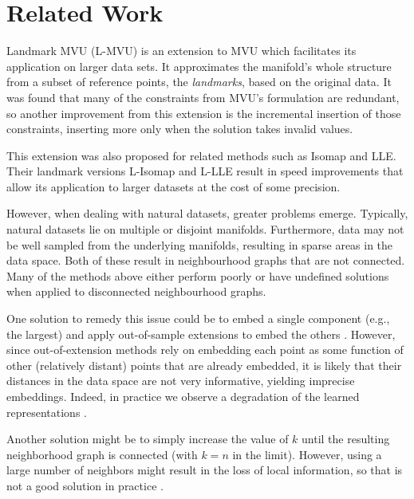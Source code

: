 \section{Related Work}

    Landmark MVU (L-MVU) \cite{l-mvu} is an extension to MVU which facilitates its application on larger data sets. It approximates the manifold's whole structure from a subset of reference points, the \textit{landmarks}, based on the original data. It was found that many of the constraints from MVU's formulation are redundant, so another improvement from this extension is the incremental insertion of those constraints, inserting more only when the solution takes invalid values.

    This extension was also proposed for related methods such as Isomap and LLE. Their landmark versions L-Isomap \cite{l-isomap, general-landmark} and L-LLE \cite{l-lle, general-landmark} result in speed improvements that allow its application to larger datasets at the cost of some precision.

    However, when dealing with natural datasets, greater problems emerge. Typically, natural datasets lie on multiple or disjoint manifolds. Furthermore, data may not be well sampled from the underlying manifolds, resulting in sparse areas in the data space. Both of these result in neighbourhood graphs that are not connected. Many of the methods above either perform poorly or have undefined solutions when applied to disconnected neighbourhood graphs.

    One solution to remedy this issue could be to embed a single component (e.g., the largest) and apply out-of-sample extensions to embed the others \cite{out-of-sample-1, out-of-sample-2, out-of-sample-3}. However, since out-of-extension methods rely on embedding each point as some function of other (relatively distant) points that are already embedded, it is likely that their distances in the data space are not very informative, yielding imprecise embeddings. Indeed, in practice we observe a degradation of the learned representations \cite{comparison}.

    Another solution might be to simply increase the value of $k$ until the resulting neighborhood graph is connected (with $k=n$ in the limit). However, using a large number of neighbors might result in the loss of local information, so that is not a good solution in practice \cite{comparison}.

